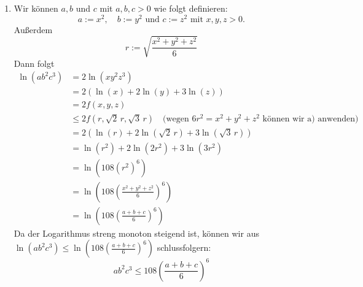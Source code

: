 \documentclass[a4paper,12pt]{article}
\begin{document}
\begin{enumerate}[label=\alph*)]
    Wir zeigen, dass $c := (r, \sqrt{2}\, r, \sqrt{3}\, r)$ ein lokales Maximum ist.
    \begin{align*}
        D_{11} f(x,y,z) &= -\frac{1}{x^2} & D_{12} f(x,y,z) &= D_{21} f(x,y,z) = 0 \\
        D_{22} f(x,y,z) &= -\frac{2}{y^2} & D_{13} f(x,y,z) &= D_{31} f(x,y,z) = 0 \\
        D_{33} f(x,y,z) &= -\frac{3}{z^2} & D_{23} f(x,y,z) &= D_{32} f(x,y,z) = 0
    \end{align*}
    \[
        H(r, \sqrt{2}\, r, \sqrt{3}\, r) = -\frac{1}{r^2} I_3
    \]
    \[
        Q(u) = -\frac{1}{r^2}(u_1^2 + u_2^2 + u_3^2) < 0 \quad \text{für jedes } u \in \mathbb{R}.
    \]
    Demnach ist $c = (r, \sqrt{2}\, r, \sqrt{3}\, r)$ ein lokales Maximum unter der Nebenbedingung $g$. $c$ ist also auch nach Satz 4.5.9 das einzige lokale Extremum von $f|_{M(g)}$.

    Noch zu zeigen, dass $c$ das globale Maximum von $f|_{M(g)}$ ist. Jeder Grenzwert $a$ einer konvergenten Folge $(a_n)$ mit $g(a_n) = 0$ für alle $n \in \mathbb{N}$ hat die Eigenschaft $a \in M(g)$, da aus der Stetigkeit von $g$
    \[
        0 = \lim_{a_n \to a} g(a_n) = g(a)
    \]
    folgt. Also ist $M(g)$ abgeschlossen. $M(g)$ ist ebenfalls beschränkt nach der euklidischen Norm, da die Nebenbedingung äquivalent zu $\sqrt{x^2 + y^2 + z^2} = \sqrt{6}\, r$ ist. $M(g)$ ist nach der euklidischen Norm die Oberfläche der Kugel mit dem Radius $\sqrt{6}\, r$. Aus der Abgeschlossenheit und Beschränkung folgt, dass $M(g)$ kompakt ist. Wegen der Kompaktheit von $M(g)$ und der Stetigkeit von f ist $c$ also das Maximum von $f|_{M(g)}$.

    \item
    Wir können $a, b$ und $c$ mit $a, b, c > 0$ wie folgt definieren:
    \[
        a := x^2, \quad b := y^2 \text{ und } c := z^2 \text{ mit } x, y, z > 0.
    \]
    Außerdem
    \[
        r := \sqrt{\frac{x^2 + y^2 + z^2}{6}}
    \]
    Dann folgt
    \begin{align*}
        \ln(a b^2 c^3) &= 2 \ln(x y^2 z^3) \\
        &= 2(\ln(x) + 2 \ln(y) + 3 \ln(z)) \\
        &= 2 f(x,y,z) \\
        &\leq 2 f(r, \sqrt{2}\, r, \sqrt{3}\, r) \quad \text{(wegen } 6r^2 = x^2 + y^2 + z^2 \text{ können wir a) anwenden)} \\
        &= 2(\ln(r) + 2 \ln(\sqrt{2}\, r) + 3 \ln(\sqrt{3}\, r)) \\
        &= \ln(r^2) + 2 \ln(2r^2) + 3 \ln(3r^2) \\
        &= \ln(108 (r^2)^6) \\
        &= \ln\left(108 \left(\frac{x^2 + y^2 + z^2}{6}\right)^6\right) \\
        &= \ln\left(108 \left(\frac{a + b + c}{6}\right)^6\right)
    \end{align*}
    Da der Logarithmus streng monoton steigend ist, können wir aus $\ln(a b^2 c^3) \leq \ln\left(108 \left(\frac{a+b+c}{6}\right)^6\right)$ schlussfolgern:
    \[
        a b^2 c^3 \leq 108 \left(\frac{a + b + c}{6}\right)^6
    \]

\end{enumerate}
\end{document}
